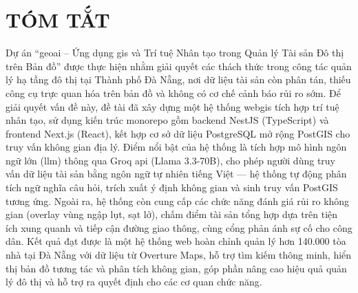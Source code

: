 
\section*{\centering TÓM TẮT}
Dự án ``\gls{geoai} -- Ứng dụng \gls{gis} và Trí tuệ Nhân tạo trong Quản lý Tài sản Đô thị trên Bản đồ'' được thực hiện nhằm giải quyết các thách thức trong công tác quản lý hạ tầng đô thị tại Thành phố Đà Nẵng, nơi dữ liệu tài sản còn phân tán, thiếu công cụ trực quan hóa trên bản đồ và không có cơ chế cảnh báo rủi ro sớm. Để giải quyết vấn đề này, đề tài đã xây dựng một hệ thống \gls{webgis} tích hợp trí tuệ nhân tạo, sử dụng kiến trúc monorepo gồm backend NestJS (TypeScript) và frontend Next.js (React), kết hợp cơ sở dữ liệu PostgreSQL mở rộng PostGIS cho truy vấn không gian địa lý. Điểm nổi bật của hệ thống là tích hợp mô hình ngôn ngữ lớn (\gls{llm}) thông qua Groq \gls{api} (Llama 3.3-70B), cho phép người dùng truy vấn dữ liệu tài sản bằng ngôn ngữ tự nhiên tiếng Việt --- hệ thống tự động phân tích ngữ nghĩa câu hỏi, trích xuất ý định không gian và sinh truy vấn PostGIS tương ứng. Ngoài ra, hệ thống còn cung cấp các chức năng đánh giá rủi ro không gian (overlay vùng ngập lụt, sạt lở), chấm điểm tài sản tổng hợp dựa trên tiện ích xung quanh và tiếp cận đường giao thông, cùng cổng phản ánh sự cố cho công dân. Kết quả đạt được là một hệ thống web hoàn chỉnh quản lý hơn 140.000 tòa nhà tại Đà Nẵng với dữ liệu từ Overture Maps, hỗ trợ tìm kiếm thông minh, hiển thị bản đồ tương tác và phân tích không gian, góp phần nâng cao hiệu quả quản lý đô thị và hỗ trợ ra quyết định cho các cơ quan chức năng.
\cleardoublepage
